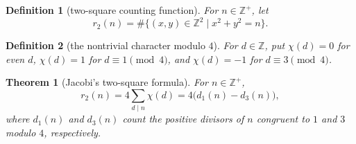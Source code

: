 \documentclass[11pt]{article}
\theoremstyle{ntstyle}
\newtheorem{theorem}{Theorem}[subsection]
\newtheorem{definition}{Definition}[subsection]
\begin{document}
\begin{definition}[two-square counting function]\label{def:8.3.1}
	For $n\in\mathbb{Z}^+$, let
	\[
		r_2(n)=\#\{(x,y)\in\mathbb{Z}^2 \mid x^2+y^2=n\}.
	\]

\end{definition}
\begin{definition}[the nontrivial character modulo $4$]\label{def:8.3.2} For $d\in\mathbb{Z}$, put $\chi(d)=0$ for even $d$, $\chi(d)=1$ for
	$d\equiv1\pmod{4}$, and $\chi(d)=-1$ for $d\equiv3\pmod{4}$.

\end{definition}
\begin{theorem}[Jacobi's two-square formula]\label{thm:8.3.1} For
	$n\in\mathbb{Z}^+$,
	\[
		r_2(n)=4\sum_{d\mid n}\chi(d)=4\big(d_1(n)-d_3(n)\big),
	\]
	where $d_1(n)$ and $d_3(n)$ count the positive divisors of $n$
	congruent to $1$ and $3$ modulo $4$, respectively.

\end{theorem}
\end{document}
